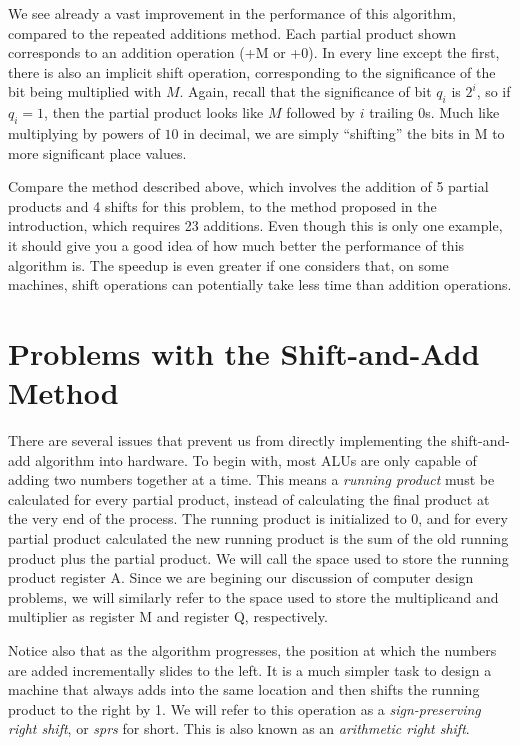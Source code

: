 \documentclass{article}
\begin{document}
We see already a vast improvement in the performance of this algorithm, compared to the repeated additions method.
Each partial product shown corresponds to an addition operation (+M or +0).
In every line except the first, there is also an implicit shift operation, corresponding to the significance of the bit being multiplied with $M$.
Again, recall that the significance of bit $q_i$ is $2^i$, so if $q_i = 1$, then the partial product looks like $M$ followed by $i$ trailing 0s.
Much like multiplying by powers of $10$ in decimal, we are simply ``shifting'' the bits in M to more significant place values.

Compare the method described above, which involves the addition of 5 partial products and 4 shifts for this problem, to the method proposed in the introduction, which requires 23 additions.
Even though this is only one example, it should give you a good idea of how much better the performance of this algorithm is.
The speedup is even greater if one considers that, on some machines, shift operations can potentially take less time than addition operations.

\pagebreak

\section{Problems with the Shift-and-Add Method}
There are several issues that prevent us from directly implementing the shift-and-add algorithm into hardware.
To begin with, most ALUs are only capable of adding two numbers together at a time.
This means a \emph{running product} must be calculated for every partial product, instead of calculating the final product at the very end of the process.
The running product is initialized to 0, and for every partial product calculated the new running product is the sum of the old running product plus the partial product.
We will call the space used to store the running product register A.
Since we are begining our discussion of computer design problems, we will similarly refer to the space used to store the multiplicand and multiplier as register M and register Q, respectively.

Notice also that as the algorithm progresses, the position at which the numbers are added incrementally slides to the left.
It is a much simpler task to design a machine that always adds into the same location and then shifts the running product to the right by 1.
We will refer to this operation as a \emph{sign-preserving right shift}, or \emph{sprs} for short.
This is also known as an \emph{arithmetic right shift}.
\end{document}
